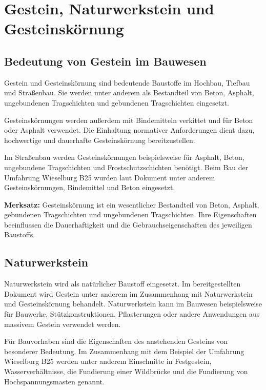 \documentclass[
  12pt,
  a4paper,
  oneside
]{scrreprt}
\begin{document}
\chapter{Gestein, Naturwerkstein und Gesteinskörnung}

\section{Bedeutung von Gestein im Bauwesen}

Gestein und Gesteinskörnung sind bedeutende Baustoffe im Hochbau,
Tiefbau und Straßenbau. Sie werden unter anderem als Bestandteil von
Beton, Asphalt, ungebundenen Tragschichten und gebundenen
Tragschichten eingesetzt. 

Gesteinskörnungen werden außerdem mit Bindemitteln verkittet und für
Beton oder Asphalt verwendet. Die Einhaltung normativer Anforderungen
dient dazu, hochwertige und dauerhafte Gesteinskörnung bereitzustellen.


Im Straßenbau werden Gesteinskörnungen beispielsweise für Asphalt,
Beton, ungebundene Tragschichten und Frostschutzschichten benötigt.
Beim Bau der Umfahrung Wieselburg B25 wurden laut Dokument unter
anderem Gesteinskörnungen, Bindemittel und Beton eingesetzt.


\begin{merksatzbox}
\textbf{Merksatz:}
Gesteinskörnung ist ein wesentlicher Bestandteil von Beton, Asphalt,
gebundenen Tragschichten und ungebundenen Tragschichten. Ihre
Eigenschaften beeinflussen die Dauerhaftigkeit und die
Gebrauchseigenschaften des jeweiligen Baustoffs.

\end{merksatzbox}

\section{Naturwerkstein}

Naturwerkstein wird als natürlicher Baustoff eingesetzt. Im
bereitgestellten Dokument wird Gestein unter anderem im Zusammenhang
mit Naturwerkstein und Gesteinskörnung behandelt. Naturwerkstein kann
im Bauwesen beispielsweise für Bauwerke, Stützkonstruktionen,
Pflasterungen oder andere Anwendungen aus massivem Gestein verwendet
werden.

Für Bauvorhaben sind die Eigenschaften des anstehenden Gesteins von
besonderer Bedeutung. Im Zusammenhang mit dem Beispiel der Umfahrung
Wieselburg B25 werden unter anderem Einschnitte in Festgestein,
Wasserverhältnisse, die Fundierung einer Wildbrücke und die Fundierung
von Hochspannungsmasten genannt. 
\end{document}
